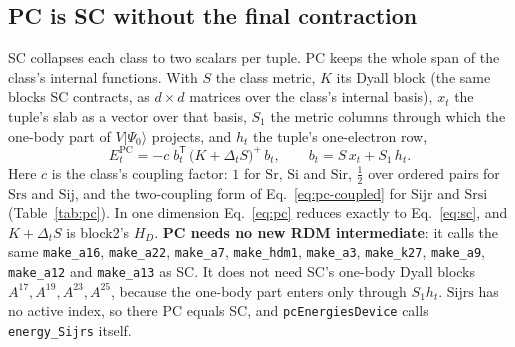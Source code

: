 \documentclass[11pt]{article}
\newcommand{\code}[1]{\texttt{#1}}
\newcommand{\cls}[1]{\ensuremath{\mathrm{#1}}}
\begin{document}
\subsection{PC is SC without the final contraction}
SC collapses each class to two scalars per tuple. PC keeps the whole span of
the class's internal functions. With $S$ the class metric, $K$ its Dyall
block (the same blocks SC contracts, as $d\times d$ matrices over the class's
internal basis), $x_t$ the tuple's slab as a vector over that basis, $S_1$
the metric columns through which the one-body part of $V|\Psi_0\rangle$
projects, and $h_t$ the tuple's one-electron row,
\begin{equation}
  E^{\mathrm{PC}}_t = -c\; b_t^{\mathsf T}\,\bigl(K + \Delta_t S\bigr)^{+}\,b_t,
  \qquad b_t = S\,x_t + S_1\,h_t.
  \label{eq:pc}
\end{equation}
Here $c$ is the class's coupling factor: $1$ for \cls{Sr}, \cls{Si} and
\cls{Sir}, $\tfrac12$ over ordered pairs for \cls{Srs} and \cls{Sij}, and
the two-coupling form of Eq.~\eqref{eq:pc-coupled} for \cls{Sijr} and
\cls{Srsi} (Table~\ref{tab:pc}). In one dimension Eq.~\eqref{eq:pc} reduces
exactly to Eq.~\eqref{eq:sc}, and $K + \Delta_t S$ is block2's $H_D$. \textbf{PC needs no new RDM intermediate}: it calls the
same \code{make\_a16}, \code{make\_a22}, \code{make\_a7}, \code{make\_hdm1},
\code{make\_a3}, \code{make\_k27}, \code{make\_a9}, \code{make\_a12} and
\code{make\_a13} as SC. It does not need SC's one-body Dyall blocks $A^{17},
A^{19}, A^{23}, A^{25}$, because the one-body part enters only through
$S_1 h_t$. \cls{Sijrs} has no active index, so there PC equals SC, and
\code{pcEnergiesDevice} calls \code{energy\_Sijrs} itself.
\end{document}

